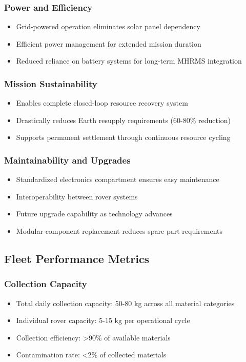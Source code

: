 \documentclass[12pt, a4paper]{article}
\begin{document}
\subsubsection{Power and Efficiency}
\begin{itemize}
    \item Grid-powered operation eliminates solar panel dependency
    \item Efficient power management for extended mission duration
    \item Reduced reliance on battery systems for long-term MHRMS integration
\end{itemize}

\subsubsection{Mission Sustainability}
\begin{itemize}
    \item Enables complete closed-loop resource recovery system
    \item Drastically reduces Earth resupply requirements (60-80\% reduction)
    \item Supports permanent settlement through continuous resource cycling
\end{itemize}

\subsubsection{Maintainability and Upgrades}
\begin{itemize}
    \item Standardized electronics compartment ensures easy maintenance
    \item Interoperability between rover systems
    \item Future upgrade capability as technology advances
    \item Modular component replacement reduces spare part requirements
\end{itemize}

\subsection{Fleet Performance Metrics}

\subsubsection{Collection Capacity}
\begin{itemize}
    \item Total daily collection capacity: 50-80 kg across all material categories
    \item Individual rover capacity: 5-15 kg per operational cycle
    \item Collection efficiency: >90\% of available materials
    \item Contamination rate: <2\% of collected materials
\end{itemize}
\end{document}
